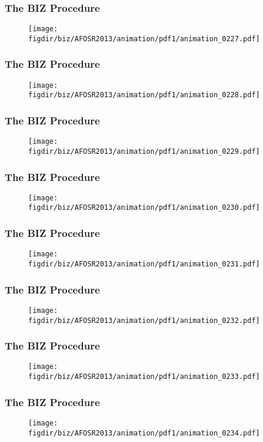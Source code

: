 \documentclass[13pt]{beamer}
\newcommand{\figdir}{../../fig}
\begin{document}
\begin{frame}\frametitle{The BIZ Procedure}\begin{figure}\texttt{[image: \\figdir/biz/AFOSR2013/animation/pdf1/animation\_0227.pdf]}\end{figure}\end{frame}
\begin{frame}\frametitle{The BIZ Procedure}\begin{figure}\texttt{[image: \\figdir/biz/AFOSR2013/animation/pdf1/animation\_0228.pdf]}\end{figure}\end{frame}
\begin{frame}\frametitle{The BIZ Procedure}\begin{figure}\texttt{[image: \\figdir/biz/AFOSR2013/animation/pdf1/animation\_0229.pdf]}\end{figure}\end{frame}
\begin{frame}\frametitle{The BIZ Procedure}\begin{figure}\texttt{[image: \\figdir/biz/AFOSR2013/animation/pdf1/animation\_0230.pdf]}\end{figure}\end{frame}
\begin{frame}\frametitle{The BIZ Procedure}\begin{figure}\texttt{[image: \\figdir/biz/AFOSR2013/animation/pdf1/animation\_0231.pdf]}\end{figure}\end{frame}
\begin{frame}\frametitle{The BIZ Procedure}\begin{figure}\texttt{[image: \\figdir/biz/AFOSR2013/animation/pdf1/animation\_0232.pdf]}\end{figure}\end{frame}
\begin{frame}\frametitle{The BIZ Procedure}\begin{figure}\texttt{[image: \\figdir/biz/AFOSR2013/animation/pdf1/animation\_0233.pdf]}\end{figure}\end{frame}
\begin{frame}\frametitle{The BIZ Procedure}\begin{figure}\texttt{[image: \\figdir/biz/AFOSR2013/animation/pdf1/animation\_0234.pdf]}\end{figure}\end{frame}
\end{document}
